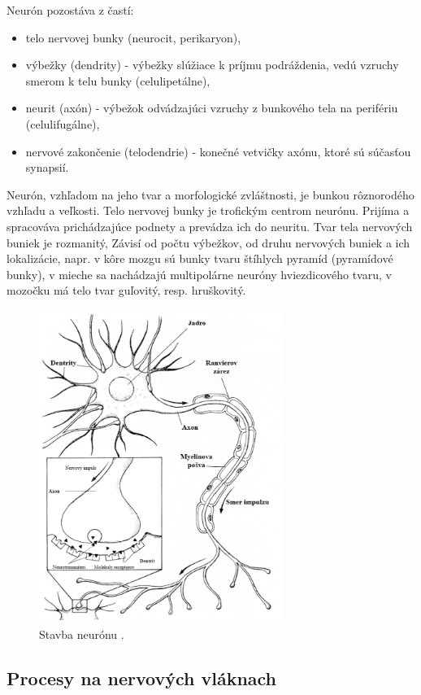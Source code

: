 Neurón pozostáva z častí:
\begin{itemize}
  \item telo nervovej bunky (neurocit, perikaryon),
  \item výbežky (dendrity) - výbežky slúžiace k príjmu podráždenia, vedú vzruchy smerom k telu bunky (celulipetálne),
  \item neurit (axón) - výbežok odvádzajúci vzruchy z bunkového tela na perifériu (celulifugálne),
  \item nervové zakončenie (telodendrie) - konečné vetvičky axónu, ktoré sú súčasťou synapsií.
\end{itemize}
Neurón, vzhľadom na jeho tvar a morfologické zvláštnosti, je bunkou rôznorodého vzhľadu a veľkosti. Telo nervovej bunky je trofickým centrom neurónu. Prijíma a spracováva prichádzajúce podnety a 
prevádza ich do neuritu. Tvar tela nervových buniek je rozmanitý, Závisí od počtu výbežkov, od druhu nervových buniek a ich lokalizácie, napr. v kôre mozgu sú bunky tvaru štíhlych pyramíd (pyramídové bunky),
v mieche sa nachádzajú multipolárne neuróny hviezdicového tvaru, v mozočku má telo tvar guľovitý, resp. hruškovitý. \cite{holecovaAnatomiaMorfologiaZivocichov2016}

\begin{figure}[!htbp]
  \centering
  \includegraphics[width=8cm]{img/neuron-schema.png}
  \caption{Stavba neurónu \cite{petrovicovaFyziologiaZivocichovCloveka2006}.}
  \label{neuron-stavba}
\end{figure}	

\subsection{Procesy na nervových vláknach}

